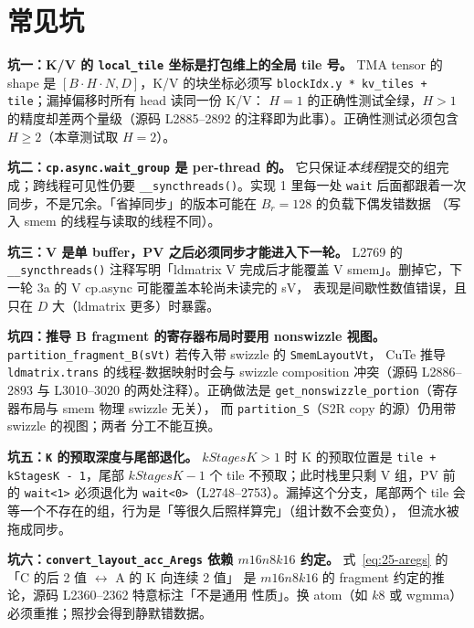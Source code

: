 \section{常见坑}

\textbf{坑一：K/V 的 \texttt{local\_tile} 坐标是打包维上的全局 tile 号。}
TMA tensor 的 shape 是 $[B\!\cdot\!H\!\cdot\!N, D]$，K/V 的块坐标必须写
\texttt{blockIdx.y * kv\_tiles + tile}；漏掉偏移时所有 head 读同一份 K/V：
$H{=}1$ 的正确性测试全绿，$H{>}1$ 的精度却差两个量级（源码 L2885--2892
的注释即为此事）。正确性测试必须包含 $H{\ge}2$（本章测试取 $H{=}2$）。

\textbf{坑二：\texttt{cp.\allowbreak{}async.\allowbreak{}wait\_\allowbreak{}group} 是 per-thread 的。}
它只保证\emph{本线程}提交的组完成；跨线程可见性仍要
\texttt{\_\allowbreak{}\_\allowbreak{}syncthreads\allowbreak{}()}。实现 1 里每一处 \texttt{wait} 后面都跟着一次
同步，不是冗余。「省掉同步」的版本可能在 $B_r{=}128$ 的负载下偶发错数据
（写入 smem 的线程与读取的线程不同）。

\textbf{坑三：V 是单 buffer，PV 之后必须同步才能进入下一轮。}
L2769 的 \texttt{\_\allowbreak{}\_\allowbreak{}syncthreads\allowbreak{}()} 注释写明「ldmatrix V 完成后才能覆盖
V smem」。删掉它，下一轮 3a 的 V cp.async 可能覆盖本轮尚未读完的 sV，
表现是间歇性数值错误，且只在 $D$ 大（ldmatrix 更多）时暴露。

\textbf{坑四：推导 B fragment 的寄存器布局时要用 nonswizzle 视图。}
\texttt{partition\_\allowbreak{}fragment\_\allowbreak{}B(sVt)} 若传入带 swizzle 的 \texttt{Smem\allowbreak{}Layout\allowbreak{}Vt}，
CuTe 推导 \texttt{ldmatrix.\allowbreak{}trans} 的线程-数据映射时会与 swizzle composition
冲突（源码 L2886--2893 与 L3010--3020 的两处注释）。正确做法是
\texttt{get\_\allowbreak{}nonswizzle\_\allowbreak{}portion}（寄存器布局与 smem 物理 swizzle 无关），
而 \texttt{partition\_S}（S2R copy 的源）仍用带 swizzle 的视图；两者
分工不能互换。

\textbf{坑五：\texttt{K} 的预取深度与尾部退化。}
$kStagesK>1$ 时 K 的预取位置是 \texttt{tile + kStagesK - 1}，尾部
$kStagesK{-}1$ 个 tile 不预取；此时栈里只剩 V 组，PV 前的 \texttt{wait<1>}
必须退化为 \texttt{wait<0>}（L2748--2753）。漏掉这个分支，尾部两个 tile
会等一个不存在的组，行为是「等很久后照样算完」（组计数不会变负），
但流水被拖成同步。

\textbf{坑六：\texttt{convert\_\allowbreak{}layout\_\allowbreak{}acc\_\allowbreak{}Aregs} 依赖 $m16n8k16$ 约定。}
式~\eqref{eq:25-aregs} 的「C 的后 2 值 $\leftrightarrow$ A 的 K 向连续 2 值」
是 $m16n8k16$ 的 fragment 约定的推论，源码 L2360--2362 特意标注「不是通用
性质」。换 atom（如 $k8$ 或 wgmma）必须重推；照抄会得到静默错数据。

